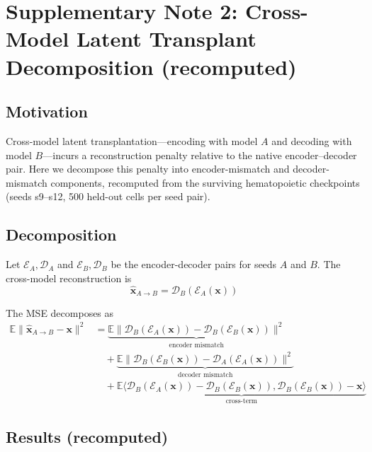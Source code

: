 \documentclass[11pt,a4paper]{article}
\begin{document}
\section*{Supplementary Note 2: Cross-Model Latent Transplant Decomposition (recomputed)}
\label{sup:transplant}

\subsection*{Motivation}

Cross-model latent transplantation---encoding with model $A$ and decoding with model $B$---incurs a reconstruction penalty relative to the native encoder--decoder pair. Here we decompose this penalty into encoder-mismatch and decoder-mismatch components, recomputed from the surviving hematopoietic checkpoints (seeds s9--s12, 500 held-out cells per seed pair).

\subsection*{Decomposition}

Let $\mathcal{E}_A, \mathcal{D}_A$ and $\mathcal{E}_B, \mathcal{D}_B$ be the encoder-decoder pairs for seeds $A$ and $B$. The cross-model reconstruction is \begin{equation}
\hat{\mathbf{x}}_{A \to B} = \mathcal{D}_B(\mathcal{E}_A(\mathbf{x}))
\end{equation}

The MSE decomposes as \begin{equation}
\begin{aligned}
\mathbb{E}\|\hat{\mathbf{x}}_{A\to B} - \mathbf{x}\|^2 &= \underbrace{\mathbb{E}\|\mathcal{D}_B(\mathcal{E}_A(\mathbf{x})) - \mathcal{D}_B(\mathcal{E}_B(\mathbf{x}))\|^2}_{\text{encoder mismatch}} \\
&\quad + \underbrace{\mathbb{E}\|\mathcal{D}_B(\mathcal{E}_B(\mathbf{x})) - \mathcal{D}_A(\mathcal{E}_A(\mathbf{x}))\|^2}_{\text{decoder mismatch}} \\
&\quad + \underbrace{\mathbb{E}\langle\mathcal{D}_B(\mathcal{E}_A(\mathbf{x})) - \mathcal{D}_B(\mathcal{E}_B(\mathbf{x})), \mathcal{D}_B(\mathcal{E}_B(\mathbf{x})) - \mathbf{x}\rangle}_{\text{cross-term}}
\end{aligned}
\end{equation}

\subsection*{Results (recomputed)}
\end{document}

